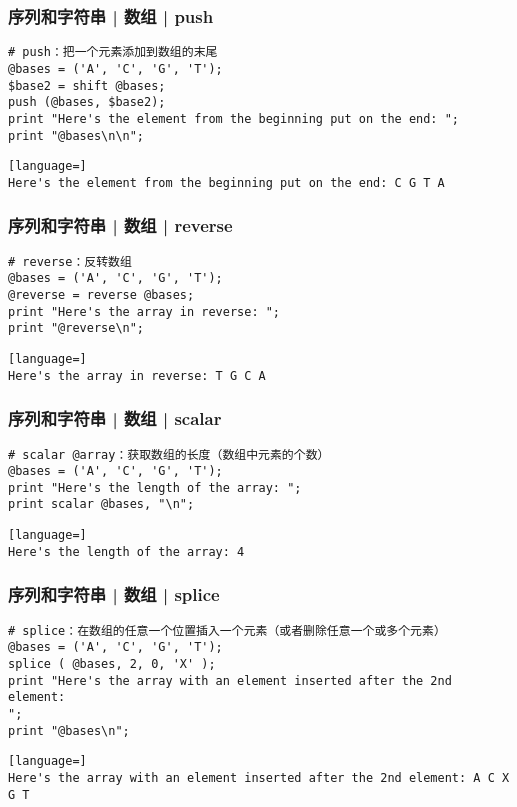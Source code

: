 \begin{frame}[fragile]
  \frametitle{序列和字符串 | 数组 | \alert{push}}
  \vspace{-1.5em}
\begin{lstlisting}
# push：把一个元素添加到数组的末尾
@bases = ('A', 'C', 'G', 'T');
$base2 = shift @bases;
push (@bases, $base2);
print "Here's the element from the beginning put on the end: ";
print "@bases\n\n";
\end{lstlisting}
\pause
\begin{lstlisting}[language=]
Here's the element from the beginning put on the end: C G T A
\end{lstlisting}
\end{frame}

\begin{frame}[fragile]
  \frametitle{序列和字符串 | 数组 | \alert{reverse}}
  \vspace{-1.5em}
\begin{lstlisting}
# reverse：反转数组
@bases = ('A', 'C', 'G', 'T');
@reverse = reverse @bases;
print "Here's the array in reverse: ";
print "@reverse\n";
\end{lstlisting}
\pause
\begin{lstlisting}[language=]
Here's the array in reverse: T G C A
\end{lstlisting}
\end{frame}

\begin{frame}[fragile]
  \frametitle{序列和字符串 | 数组 | \alert{scalar}}
  \vspace{-1.5em}
\begin{lstlisting}
# scalar @array：获取数组的长度（数组中元素的个数）
@bases = ('A', 'C', 'G', 'T');
print "Here's the length of the array: ";
print scalar @bases, "\n";
\end{lstlisting}
\pause
\begin{lstlisting}[language=]
Here's the length of the array: 4
\end{lstlisting}
\end{frame}

\begin{frame}[fragile]
  \frametitle{序列和字符串 | 数组 | \alert{splice}}
  \vspace{-1.5em}
\begin{lstlisting}
# splice：在数组的任意一个位置插入一个元素（或者删除任意一个或多个元素）
@bases = ('A', 'C', 'G', 'T');
splice ( @bases, 2, 0, 'X' );
print "Here's the array with an element inserted after the 2nd element:
";
print "@bases\n";
\end{lstlisting}
\pause
\begin{lstlisting}[language=]
Here's the array with an element inserted after the 2nd element: A C X G T
\end{lstlisting}
\end{frame}

